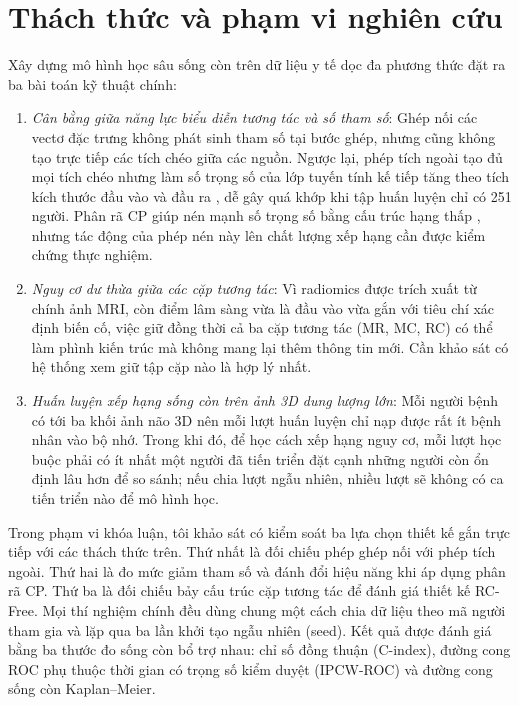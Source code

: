 \section{Thách thức và phạm vi nghiên cứu}
Xây dựng mô hình học sâu sống còn trên dữ liệu y tế dọc đa phương thức đặt ra ba bài toán kỹ thuật chính:
\begin{enumerate}
\item \emph{Cân bằng giữa năng lực biểu diễn tương tác và số tham số}: Ghép nối các vectơ đặc trưng không phát sinh tham số tại bước ghép, nhưng cũng không tạo trực tiếp các tích chéo giữa các nguồn. Ngược lại, phép tích ngoài tạo đủ mọi tích chéo nhưng làm số trọng số của lớp tuyến tính kế tiếp tăng theo tích kích thước đầu vào và đầu ra \cite{zadeh2017tensor,liu2018lowrank}, dễ gây quá khớp khi tập huấn luyện chỉ có 251 người. Phân rã CP giúp nén mạnh số trọng số bằng cấu trúc hạng thấp \cite{kolda2009tensor,liu2018lowrank}, nhưng tác động của phép nén này lên chất lượng xếp hạng cần được kiểm chứng thực nghiệm.
\item \emph{Nguy cơ dư thừa giữa các cặp tương tác}: Vì radiomics được trích xuất từ chính ảnh MRI, còn điểm lâm sàng vừa là đầu vào vừa gắn với tiêu chí xác định biến cố, việc giữ đồng thời cả ba cặp tương tác (MR, MC, RC) có thể làm phình kiến trúc mà không mang lại thêm thông tin mới. Cần khảo sát có hệ thống xem giữ tập cặp nào là hợp lý nhất.
\item \emph{Huấn luyện xếp hạng sống còn trên ảnh 3D dung lượng lớn}: Mỗi người bệnh có tới ba khối ảnh não 3D nên mỗi lượt huấn luyện chỉ nạp được rất ít bệnh nhân vào bộ nhớ. Trong khi đó, để học cách xếp hạng nguy cơ, mỗi lượt học buộc phải có ít nhất một người đã tiến triển đặt cạnh những người còn ổn định lâu hơn để so sánh; nếu chia lượt ngẫu nhiên, nhiều lượt sẽ không có ca tiến triển nào để mô hình học.
\end{enumerate}

Trong phạm vi khóa luận, tôi khảo sát có kiểm soát ba lựa chọn thiết kế gắn trực tiếp với các thách thức trên. Thứ nhất là đối chiếu phép ghép nối với phép tích ngoài. Thứ hai là đo mức giảm tham số và đánh đổi hiệu năng khi áp dụng phân rã CP. Thứ ba là đối chiếu bảy cấu trúc cặp tương tác để đánh giá thiết kế RC-Free. Mọi thí nghiệm chính đều dùng chung một cách chia dữ liệu theo mã người tham gia và lặp qua ba lần khởi tạo ngẫu nhiên (seed). Kết quả được đánh giá bằng ba thước đo sống còn bổ trợ nhau: chỉ số đồng thuận (C-index), đường cong ROC phụ thuộc thời gian có trọng số kiểm duyệt (IPCW-ROC) và đường cong sống còn Kaplan--Meier.


